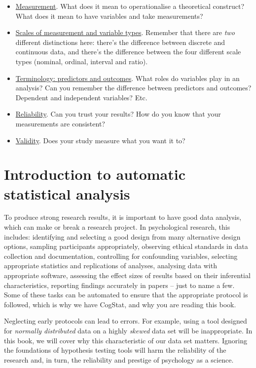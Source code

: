 \documentclass[
  11pt,
]{book}
\providecommand{\tightlist}{%
  \setlength{\itemsep}{0pt}\setlength{\parskip}{0pt}}
\theoremstyle{definition}
\theoremstyle{definition}
\theoremstyle{definition}
\theoremstyle{definition}
\theoremstyle{remark}
\begin{document}
\begin{itemize}
\tightlist
\item
  \protect\hyperlink{measurement}{Measurement}. What does it mean to operationalise a theoretical construct? What does it mean to have variables and take measurements?
\item
  \protect\hyperlink{scales}{Scales of measurement and variable types}. Remember that there are \emph{two} different distinctions here: there's the difference between discrete and continuous data, and there's the difference between the four different scale types (nominal, ordinal, interval and ratio).
\item
  \protect\hyperlink{ivdv}{Terminology: predictors and outcomes}. What roles do variables play in an analysis? Can you remember the difference between predictors and outcomes? Dependent and independent variables? Etc.
\item
  \protect\hyperlink{reliability}{Reliability}. Can you trust your results? How do you know that your measurements are consistent?
\item
  \protect\hyperlink{validity}{Validity}. Does your study measure what you want it to?
\end{itemize}

\hypertarget{autostat}{%
\chapter{Introduction to automatic statistical analysis}\label{autostat}}

To produce strong research results, it is important to have good data analysis, which can make or break a research project. In psychological research, this includes: identifying and selecting a good design from many alternative design options, sampling participants appropriately, observing ethical standards in data collection and documentation, controlling for confounding variables, selecting appropriate statistics and replications of analyses, analysing data with appropriate software, assessing the effect sizes of results based on their inferential characteristics, reporting findings accurately in papers -- just to name a few. Some of these tasks can be automated to ensure that the appropriate protocol is followed, which is why we have CogStat, and why you are reading this book.

Neglecting early protocols can lead to errors. For example, using a tool designed for \emph{normally distributed} data on a highly \emph{skewed} data set will be inappropriate. In this book, we will cover why this characteristic of our data set matters. Ignoring the foundations of hypothesis testing tools will harm the reliability of the research and, in turn, the reliability and prestige of psychology as a science.
\end{document}
